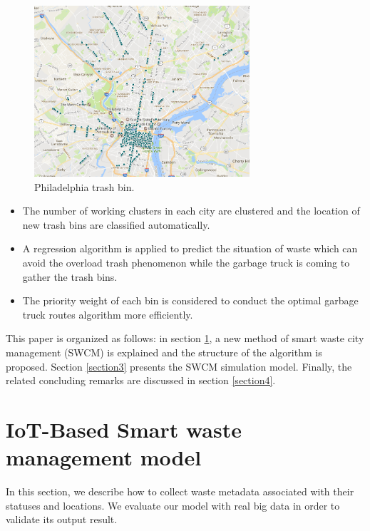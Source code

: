 \documentclass[conference]{IEEEtran}
\begin{document}
\begin{figure}
	\centering

		\includegraphics[width=8cm]{overview1}
	
	

	\caption{Philadelphia trash bin.}
	\label{Philadelphia}
\end{figure}

\begin{itemize}
	\item The number of working clusters in each city are clustered and the location of new trash bins are classified automatically. 
	
	\item A regression algorithm is applied to predict the situation of waste which can avoid the overload trash phenomenon while the garbage truck is coming to gather the trash bins.
	
	\item The priority weight of each bin is considered to conduct the optimal garbage truck routes algorithm more efficiently.
	
\end{itemize}

This paper is organized as follows: in section \ref{section2},  a new method of smart waste city management (SWCM) is explained and the structure of the algorithm is proposed. Section \ref{section3} presents the SWCM simulation model. Finally, the related concluding remarks are discussed in section \ref{section4}.



\section{IoT-Based Smart waste management model}
\label{section2}
In this section, we describe how to collect waste metadata associated with their statuses and locations. We evaluate our model with real big data in order to validate its output result.
\end{document}
